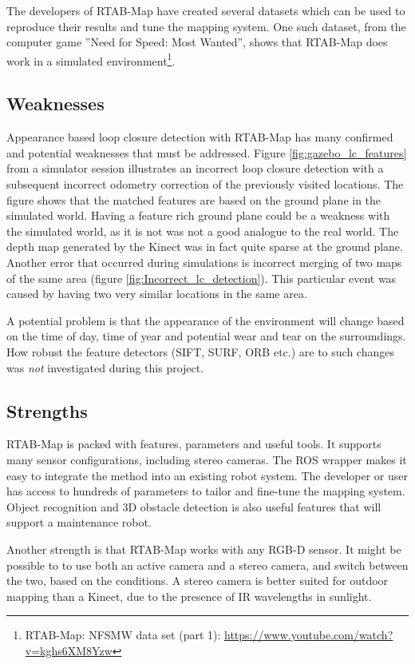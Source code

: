The developers of \ac{RTAB-Map} have created several datasets which can be used to reproduce their results and tune the mapping system. One such dataset, from the computer game ''Need for Speed: Most Wanted'', shows that \ac{RTAB-Map} does work in a simulated environment\footnote{RTAB-Map: NFSMW data set (part 1): \url{https://www.youtube.com/watch?v=kghs6XM8Yzw}}. 


\subsection{Weaknesses}
\label{sec:weaknesses_mapping}
Appearance based loop closure detection with \ac{RTAB-Map} has many confirmed and potential weaknesses that must be addressed. Figure \ref{fig:gazebo_lc_features} from a simulator session illustrates an incorrect loop closure detection with a subsequent incorrect odometry correction of the previously visited locations. The figure shows that the matched features are based on the ground plane in the simulated world. Having a feature rich ground plane could be a weakness with the simulated world, as it is not was not a good analogue to the real world. The depth map generated by the Kinect was in fact quite sparse at the ground plane. Another error that occurred during simulations is incorrect merging of two maps of the same area (figure \ref{fig:Incorrect_lc_detection}). This particular event was caused by having two very similar locations in the same area. 

A potential problem is that the appearance of the environment will change based on the time of day, time of year and potential wear and tear on the surroundings. How robust the feature detectors (\ac{SIFT}, \ac{SURF}, \ac{ORB} etc.) are to such changes was \textit{not} investigated during this project.  

\subsection{Strengths}

\ac{RTAB-Map} is packed with features, parameters and useful tools. It supports many sensor configurations, including stereo cameras. The \ac{ROS} wrapper makes it easy to integrate the method into an existing robot system. The developer or user has access to hundreds of parameters to tailor and fine-tune the mapping system. Object recognition and 3D obstacle detection is also useful features that will support a maintenance robot. 

Another strength is that \ac{RTAB-Map} works with any RGB-D sensor. It might be possible to to use both an active camera and a stereo camera, and switch between the two, based on the conditions. A stereo camera is better suited for outdoor mapping than a Kinect, due to the presence of IR wavelengths in sunlight. 


